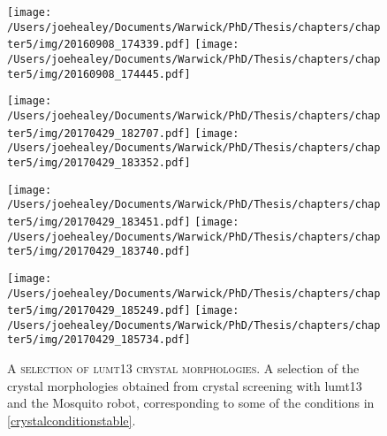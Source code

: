 \begin{figure}[p]

	\centering                                   %
	\texttt{[image: /Users/joehealey/Documents/Warwick/PhD/Thesis/chapters/chapter5/img/20160908\_174339.pdf]}
	\texttt{[image: /Users/joehealey/Documents/Warwick/PhD/Thesis/chapters/chapter5/img/20160908\_174445.pdf]}
	
	\texttt{[image: /Users/joehealey/Documents/Warwick/PhD/Thesis/chapters/chapter5/img/20170429\_182707.pdf]}
	\texttt{[image: /Users/joehealey/Documents/Warwick/PhD/Thesis/chapters/chapter5/img/20170429\_183352.pdf]}
	
	\texttt{[image: /Users/joehealey/Documents/Warwick/PhD/Thesis/chapters/chapter5/img/20170429\_183451.pdf]}
	\texttt{[image: /Users/joehealey/Documents/Warwick/PhD/Thesis/chapters/chapter5/img/20170429\_183740.pdf]}
	
	\texttt{[image: /Users/joehealey/Documents/Warwick/PhD/Thesis/chapters/chapter5/img/20170429\_185249.pdf]}
	\texttt{[image: /Users/joehealey/Documents/Warwick/PhD/Thesis/chapters/chapter5/img/20170429\_185734.pdf]}

	\captionsetup{singlelinecheck=off, justification=justified, font=footnotesize, aboveskip=10pt}
	\caption[Crystal images]{\textsc{\normalsize A selection of lumt13 crystal morphologies.}\vspace{0.1cm} \newline A selection of the crystal morphologies obtained from crystal screening with lumt13 and the Mosquito robot, corresponding to some of the conditions in \vref{crystalconditionstable}.}
	\label{crystals}
\end{figure}

\clearpage


